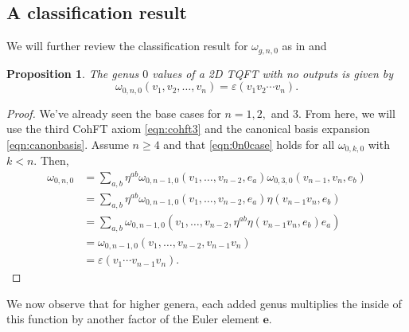 \documentclass{amsart}
\newcommand{\be}{\begin{equation}}
\newcommand{\ee}{\end{equation}}
\newcommand{\eps}{\varepsilon}
\newcommand{\eul}{\mathbf{e}}
\newtheorem{Prop}[Lem]{Proposition}
\theoremstyle{definition}
\begin{document}
\subsection{A classification result}
We will further review the classification result for $\omega_{g,n,0}$ as in \cite{DM_invitation} and \cite{DM_ribbon}

\begin{Prop}\label{prop:0n0case}
    The genus $0$ values of a 2D TQFT with no outputs is given by 
    \be\label{eqn:0n0case}
    \omega_{0,n,0}(v_1,v_2,\ldots,v_n)=\eps(v_1v_2\cdots v_n).
    \ee
\end{Prop}
\begin{proof}
    We've already seen the base cases for $n=1,2,$ and $3$. From here, we will use the third CohFT axiom \ref{eqn:cohft3} and the canonical basis expansion \ref{eqn:canonbasis}. Assume $n\geq 4$ and that \ref{eqn:0n0case} holds for all $\omega_{0,k,0}$ with $k<n$. Then,
    \begin{align*}
        \omega_{0,n,0}&=\sum_{a,b}\eta^{ab}\omega_{0,n-1,0}(v_1,\ldots,v_{n-2},e_a)\omega_{0,3,0}(v_{n-1},v_n,e_b)\\
        &=\sum_{a,b}\eta^{ab}\omega_{0,n-1,0}(v_1,\ldots,v_{n-2},e_a)\eta(v_{n-1}v_n,e_b)\\
        &=\sum_{a,b}\omega_{0,n-1,0}(v_1,\ldots,v_{n-2},\eta^{ab}\eta(v_{n-1}v_n,e_b)e_a)\\
        &=\omega_{0,n-1,0}(v_1,\ldots,v_{n-2},v_{n-1}v_n)\\
        &=\eps(v_1\cdots v_{n-1}v_n).
    \end{align*}
\end{proof}
\noindent We now observe that for higher genera, each added genus multiplies the inside of this function by another factor of the Euler element $\eul$.
\end{document}
